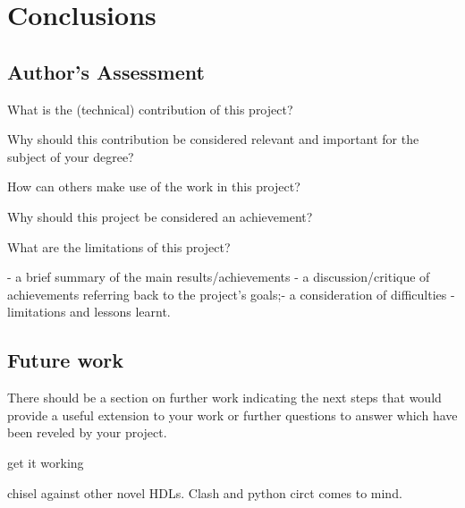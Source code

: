 \chapter{Conclusions}
\label{ch:conclusions}

\section{Author's Assessment}
What is the (technical) contribution of this project?

Why should this contribution be considered relevant and important for the subject of your degree?

How can others make use of the work in this project?

Why should this project be considered an achievement?

What are the limitations of this project?

- a brief summary of the main results/achievements
- a discussion/critique of achievements referring back to the project's goals;- a consideration of difficulties
- limitations and lessons learnt.

\section{Future work}

There should be a section on further work indicating the next steps that would provide a useful extension to your work or further questions to answer which have been reveled by your project.

get it working

chisel against other novel HDLs. Clash and python circt comes to mind.




